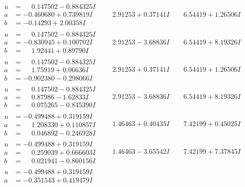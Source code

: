 \documentclass[1p]{elsarticle_modified}
\theoremstyle{definition}
\begin{document}
$$\begin{array}{c|c|c}
\begin{aligned}
u &= \phantom{-}0.147502 - 0.884325 I \\
a &= -0.460680 + 0.739819 I \\
b &= -0.14293 + 2.00358 I\end{aligned}
 & \phantom{-}2.91253 + 0.37141 I & \phantom{-}6.54419 + 1.26506 I \\ \hline\begin{aligned}
u &= \phantom{-}0.147502 - 0.884325 I \\
a &= -0.830945 + 0.100702 I \\
b &= \phantom{-}1.92441 + 0.89790 I\end{aligned}
 & \phantom{-}2.91253 - 3.68836 I & \phantom{-}6.54419 + 8.19326 I \\ \hline\begin{aligned}
u &= \phantom{-}0.147502 - 0.884325 I \\
a &= \phantom{-}1.75919 + 0.06636 I \\
b &= -0.902380 - 0.298066 I\end{aligned}
 & \phantom{-}2.91253 + 0.37141 I & \phantom{-}6.54419 + 1.26506 I \\ \hline\begin{aligned}
u &= \phantom{-}0.147502 - 0.884325 I \\
a &= \phantom{-}0.87986 - 1.62833 I \\
b &= \phantom{-}0.075265 - 0.845390 I\end{aligned}
 & \phantom{-}2.91253 - 3.68836 I & \phantom{-}6.54419 + 8.19326 I \\ \hline\begin{aligned}
u &= -0.499488 + 0.319159 I \\
a &= \phantom{-}1.208330 + 0.110857 I \\
b &= \phantom{-}0.046892 - 0.246928 I\end{aligned}
 & \phantom{-}1.46463 + 0.40435 I & \phantom{-}7.42199 + 0.45025 I \\ \hline\begin{aligned}
u &= -0.499488 + 0.319159 I \\
a &= \phantom{-}0.259039 + 0.666603 I \\
b &= \phantom{-}0.021941 - 0.860156 I\end{aligned}
 & \phantom{-}1.46463 - 3.65542 I & \phantom{-}7.42199 + 7.37845 I \\ \hline\begin{aligned}
u &= -0.499488 + 0.319159 I \\
a &= -0.351543 + 0.419479 I \\

\end{aligned}
\end{array}$$
\end{document}
